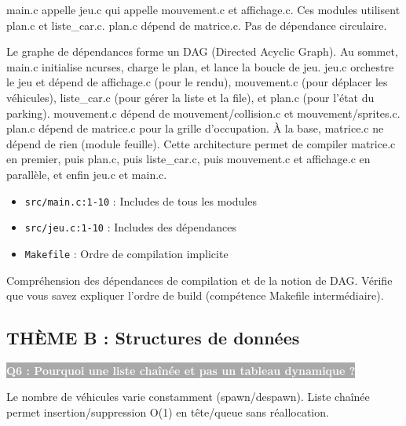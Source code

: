\documentclass[12pt,a4paper]{article}
\newcommand{\question}[1]{%
    \vspace{0.5cm}
    \noindent\colorbox{darkgray}{\textcolor{white}{\textbf{#1}}}
    \vspace{0.3cm}
}
\begin{document}
\begin{reponse_courte}
main.c appelle jeu.c qui appelle mouvement.c et affichage.c. Ces modules utilisent plan.c et liste\_car.c. plan.c dépend de matrice.c. Pas de dépendance circulaire.
\end{reponse_courte}

\begin{reponse_longue}
Le graphe de dépendances forme un DAG (Directed Acyclic Graph). Au sommet, main.c initialise ncurses, charge le plan, et lance la boucle de jeu. jeu.c orchestre le jeu et dépend de affichage.c (pour le rendu), mouvement.c (pour déplacer les véhicules), liste\_car.c (pour gérer la liste et la file), et plan.c (pour l'état du parking). mouvement.c dépend de mouvement/collision.c et mouvement/sprites.c. plan.c dépend de matrice.c pour la grille d'occupation. À la base, matrice.c ne dépend de rien (module feuille). Cette architecture permet de compiler matrice.c en premier, puis plan.c, puis liste\_car.c, puis mouvement.c et affichage.c en parallèle, et enfin jeu.c et main.c.
\end{reponse_longue}

\begin{reference_code}
\begin{itemize}
    \item \texttt{src/main.c:1-10} : Includes de tous les modules
    \item \texttt{src/jeu.c:1-10} : Includes des dépendances
    \item \texttt{Makefile} : Ordre de compilation implicite
\end{itemize}
\end{reference_code}

\begin{objectif_prof}
Compréhension des dépendances de compilation et de la notion de DAG. Vérifie que vous savez expliquer l'ordre de build (compétence Makefile intermédiaire).
\end{objectif_prof}

\subsection{THÈME B : Structures de données}

\question{Q6 : Pourquoi une liste chaînée et pas un tableau dynamique ?}

\begin{reponse_courte}
Le nombre de véhicules varie constamment (spawn/despawn). Liste chaînée permet insertion/suppression O(1) en tête/queue sans réallocation.
\end{reponse_courte}
\end{document}

